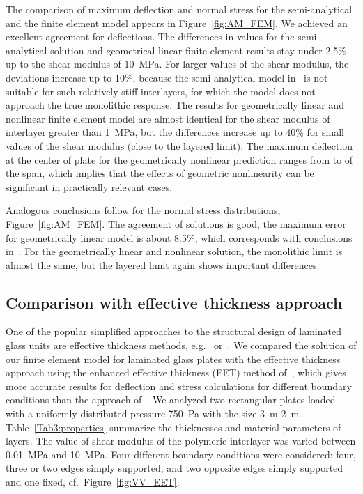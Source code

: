 \documentclass[11pt]{article}
\newcommand{\Tref}[1]{Table~\ref{#1}}
\begin{document}
The comparison of maximum deflection and normal stress for the semi-analytical and the finite element model appears in Figure~\ref{fig:AM_FEM}. We achieved an excellent agreement for deflections. The differences in values for the semi-analytical solution and geometrical linear finite element results stay under 2.5\% up to the shear modulus of 10~MPa. For larger values of the shear modulus, the deviations increase up to 10\%, because the semi-analytical model in~\cite{Foraboschi:2012:AMLGP} is not suitable for such relatively stiff interlayers,
for which the model does not approach the true monolithic response. The results for geometrically linear and nonlinear finite element model are almost identical for the shear modulus of interlayer greater than 1~MPa, but the differences increase up to 40\% for small values of the shear modulus (close to the layered limit). The maximum deflection at the center of plate for the geometrically nonlinear prediction ranges from  to  of the span, which implies that the effects of geometric nonlinearity can be significant in practically relevant cases.

Analogous conclusions follow for the normal stress distributions, Figure~\ref{fig:AM_FEM}. The agreement of solutions is good, the maximum error for geometrically linear model is about 8.5\%, which corresponds with conclusions in~\cite{Foraboschi:2012:AMLGP}. For the geometrically linear and nonlinear solution, the monolithic limit is almost the same, but the layered limit again shows important differences.

\subsection{Comparison with effective thickness approach}\label{sec:verET} 
One of the popular simplified approaches to the structural design of laminated glass units are effective thickness methods, e.g.~\cite{Benninson:2008:HPLG} or~\cite{Galuppi:2012:PEFD}. We compared the solution of our finite element model for laminated glass plates with the effective thickness approach using the enhanced effective thickness (EET) method of~\cite{Galuppi:2012:PEFD}, which gives more accurate results for deflection and stress calculations for different boundary conditions than the approach of~\cite{Benninson:2008:HPLG}. We  analyzed two rectangular plates loaded with a uniformly distributed pressure 750~Pa with the size 3~m  2~m. \Tref{Tab3:properties} summarize the thicknesses and material parameters of layers. The value of shear modulus of the polymeric interlayer was varied between 0.01~MPa and 10~MPa. Four different boundary conditions were considered: four, three or two edges simply supported, and two opposite edges simply supported and one fixed, cf.~Figure~\ref{fig:VV_EET}.
\end{document}
